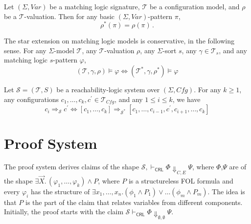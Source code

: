 \documentclass{article}
\newcommand{\CRL}{\mathsf{CRL}}
\newcommand{\Tcfg}{\mathcal{T}_{\mathit{Cfg}}}
\begin{document}
\begin{lemma}\label{lem:rhoStarOfPi}
    Let $(\Sigma, \mathit{Var})$ be a matching logic signature, $\mathcal{T}$ be a configuration model,
    and $\rho$ be a $\mathcal{T}$-valuation. Then for any basic $(\Sigma, \mathit{Var})$-pattern $\pi$,
    \begin{equation}
        \rho^*(\pi) = \rho(\pi) \, .
    \end{equation}
\end{lemma}

\begin{lemma}\label{lem:starConservative}
    The star extension on matching logic models is conservative, in the following sense.
    For any $\Sigma$-model $\mathcal{T}$, any $\mathcal{T}$-valuation $\rho$,
    any $\Sigma$-sort $s$,
    any $\gamma \in \mathcal{T}_s$,
    and any matching logic $s$-pattern $\varphi$,
    \begin{equation*}
        (\mathcal{T}, \gamma, \rho) \vDash \varphi \iff (\mathcal{T}^*, \gamma, \rho^*) \vDash \varphi
    \end{equation*}
\end{lemma}

\begin{lemma}\label{lem:compositeStep}
    Let $\mathcal{S} = (\mathcal{T}, S)$ be a reachability-logic system over $(\Sigma, \mathit{Cfg})$.
    For any $k \geq 1$, any configurations $c_1,\ldots,c_k, c^\prime \in \Tcfg$, and any $1 \leq i \leq k$,
    we have
    \begin{equation*}
        c_i \Rightarrow_{\mathcal{S}} c^\prime
                    \iff
        [c_1,\ldots,c_k] \Rightarrow_{\mathcal{S}^*} [c_1, \ldots, c_{i-1}, c^\prime, c_{i+1}, \ldots, c_k]
    \end{equation*}
\end{lemma}



\section{Proof System}

The proof system derives claims of the shape
$\mathcal{S}, \vdash_\CRL \Phi \Downarrow_{C,E} \Psi$,
where $\Phi$,$\Psi$ are of the shape
$\exists \vec{X}.\, (\varphi_1, \ldots, \varphi_k) \land P$,
where $P$ is a structureless FOL formula
and every $\varphi_i$ has the structure of
$\exists x_1,\ldots,x_n. (\phi_1 \land P_1) \lor \ldots (\phi_m \land P_m)$.
The idea is that $P$ is the part of the claim that relates variables from different components.
Initially, the proof starts with the claim
$\mathcal{S} \vdash_\CRL \Phi \Downarrow_{\emptyset, \emptyset} \Psi$.
\end{document}
